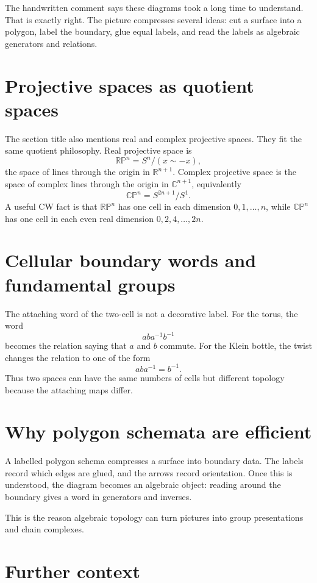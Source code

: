 The handwritten comment says these diagrams took a long time to understand.  That is exactly right.  The picture compresses several ideas: cut a surface into a polygon, label the boundary, glue equal labels, and read the labels as algebraic generators and relations.

\section{Projective spaces as quotient spaces}

The section title also mentions real and complex projective spaces.  They fit the same quotient philosophy.  Real projective space is
\[
  \mathbb{RP}^n=S^n/(x\sim -x),
\]
the space of lines through the origin in $\mathbb R^{n+1}$.  Complex projective space is the space of complex lines through the origin in $\mathbb C^{n+1}$, equivalently
\[
  \mathbb{CP}^n=S^{2n+1}/S^1.
\]
A useful CW fact is that $\mathbb{RP}^n$ has one cell in each dimension $0,1,\ldots,n$, while $\mathbb{CP}^n$ has one cell in each even real dimension $0,2,4,\ldots,2n$.


\section{Cellular boundary words and fundamental groups}

The attaching word of the two-cell is not a decorative label.  For the torus, the word
\[
  aba^{-1}b^{-1}
\]
becomes the relation saying that \(a\) and \(b\) commute.  For the Klein bottle, the twist changes the relation to one of the form
\[
  aba^{-1}=b^{-1}.
\]
Thus two spaces can have the same numbers of cells but different topology because the attaching maps differ.

\section{Why polygon schemata are efficient}

A labelled polygon schema compresses a surface into boundary data.  The labels record which edges are glued, and the arrows record orientation.  Once this is understood, the diagram becomes an algebraic object: reading around the boundary gives a word in generators and inverses.

This is the reason algebraic topology can turn pictures into group presentations and chain complexes.

\section{Further context}

